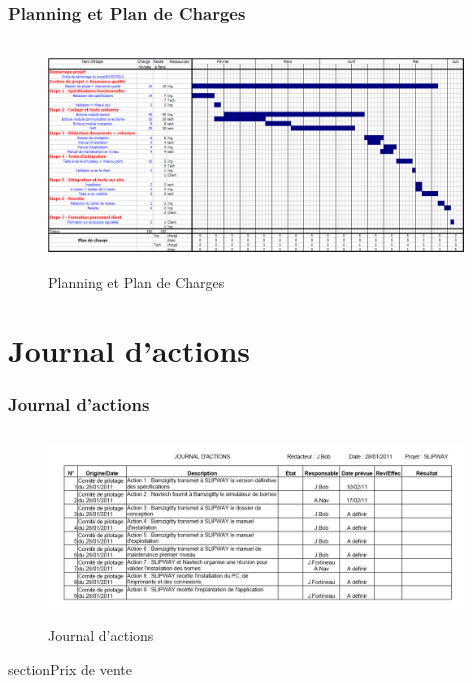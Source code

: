\documentclass{beamer}
\begin{document}
\begin{frame}\frametitle{Planning et Plan de Charges}
\begin{figure}[t]
  		\centering
  		\includegraphics[height=6cm,width=11cm]{images/Planning.PNG}
  		\caption{Planning et Plan de Charges}
  		\label{Planning}
	\end{figure}
\end{frame}

\section{Journal d'actions}

\begin{frame}\frametitle{Journal d'actions}
\begin{figure}[t]
  		\centering
  		\includegraphics[height=5cm,width=11cm]{images/journal_dactions.PNG}
  		\caption{Journal d'actions}
  		\label{JournalActions}
	\end{figure}
\end{frame}



section{Prix de vente}
\end{document}
